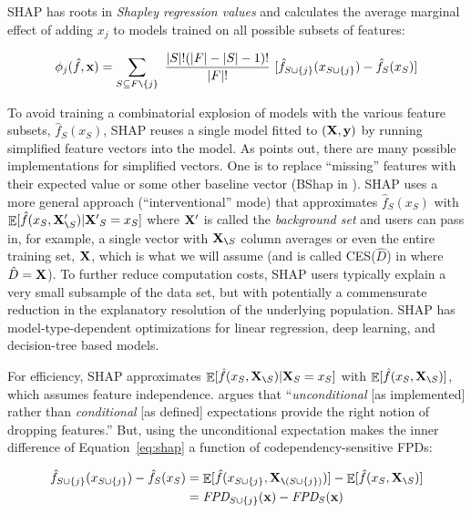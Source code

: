 \documentclass[smallextended]{svjour3}       %
\renewcommand{\eqref}[1]{Equation~\ref{#1}}
\renewcommand{\slash}{\texttt{\char`\\}}
\DeclareMathOperator{\Ex}{\mathbb{E}}
\begin{document}

SHAP \cite{shap} has roots in {\em Shapley regression values} \cite{shapley-regression} and calculates the average marginal effect of adding $x_j$ to models trained on all possible  subsets of features:
\vspace{-5mm}

\begin{equation}\label{eq:shap}
\phi_j(\hat{f},{\bf x}) = \sum_{S \subseteq F \slash \{j\}}\
\frac{|S|!(|F|-|S|-1)!}{|F|!}\
 [ \hat{f}_{S \cup \{j\}}(x_{S \cup \{j\}}) - \hat{f}_S(x_S) ]
\end{equation}\vspace{-4mm}

To avoid training a combinatorial explosion of models with the various feature subsets, $\hat{f}_S(x_S)$, SHAP reuses a single model fitted to $(\bf X, y)$ by running simplified feature vectors into the model. As \cite{manyshap} points out, there are many possible implementations for simplified vectors. One is to replace ``missing''  features with their expected value or some other baseline vector (BShap in \cite{manyshap}). SHAP uses a more general approach (``interventional'' mode) that approximates $\hat{f}_S(x_S)$ with $\Ex[\hat{f}(x_{S},{\bf X}'_{\slash S}) | {\bf X'}_S = x_S]$ where ${\bf X}'$ is called the {\em background set} and users can pass in, for example, a single vector with ${\bf X}_{\slash S}$ column averages or even the entire training set, $\bf X$, which is what we will assume (and is called CES($\hat{D}$) in \cite{manyshap} where $\hat{D}={\bf X}$). To further reduce computation costs, SHAP users typically explain a very small subsample of the data set, but with potentially a commensurate reduction in the explanatory resolution of the underlying population. SHAP has model-type-dependent optimizations for linear regression, deep learning, and decision-tree based models.

For efficiency, SHAP approximates $\Ex[\hat{f}(x_{S},{\bf X}_{\slash S}) | {\bf X}_S = x_S]$ with $\Ex[\hat{f}(x_{S},{\bf X}_{\slash S})]$, which assumes feature independence. \cite{janzing2019feature} argues that ``{\em unconditional} [as implemented] rather than {\em conditional} [as defined] expectations provide the right notion of dropping features.''  But, using the unconditional expectation makes the inner difference of \eqref{eq:shap} a function of codependency-sensitive FPDs:

\vspace{-4mm}\begin{equation}
\begin{split}
\hat{f}_{S \cup \{j\}}(x_{S \cup \{j\}}) - \hat{f}_S(x_S) & = \Ex[\hat{f}(x_{S \cup \{j\}},{\bf X}_{\slash (S \cup \{j\})})] - \Ex[\hat{f}(x_{S},{\bf X}_{\slash S})]\\
 & = \text{\it FPD}_{S \cup \{j\}}({\bf x}) - \text{\it FPD}_{S}({\bf x})
\end{split}
\end{equation}\vspace{-4mm}
\end{document}
